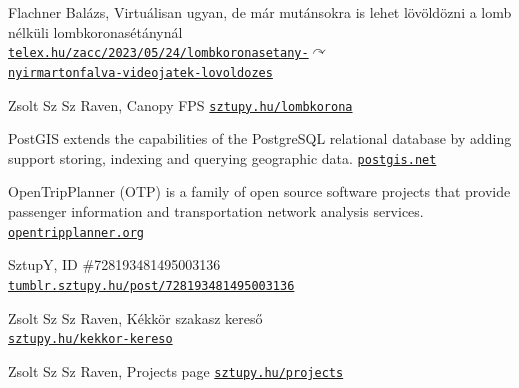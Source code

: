 \documentclass[a5paper,10pt]{article}
\begin{document}
\begin{thebibliography}{99}
 Flachner Balázs, Virtuálisan ugyan, de már mutánsokra is lehet lövöldözni a lomb nélküli lombkoronasétánynál\\
\href{https://telex.hu/zacc/2023/05/24/lombkoronasetany-nyirmartonfalva-videojatek-lovoldozes}{\texttt{telex.hu/zacc/2023/05/24/lombkoronasetany-}$\curvearrowright$\\\texttt{nyirmartonfalva-videojatek-lovoldozes}}

 Zsolt Sz Sz Raven, Canopy FPS \href{https://sztupy.hu/lombkorona/}{\texttt{sztupy.hu/lombkorona}}

 PostGIS extends the capabilities of the PostgreSQL relational database by adding support storing, indexing and querying geographic data.
\href{https://postgis.net/}{\texttt{postgis.net}}

 OpenTripPlanner (OTP) is a family of open source software projects that provide passenger information and transportation network analysis services. \\
\href{https://opentripplanner.org/}{\texttt{opentripplanner.org}}

 SztupY, ID \#728193481495003136 \\
\href{https://tumblr.sztupy.hu/post/728193481495003136}{\texttt{tumblr.sztupy.hu/post/728193481495003136}}

 Zsolt Sz Sz Raven, Kékkör szakasz kereső \\
\href{https://sztupy.hu/kekkor-kereso/}{\texttt{sztupy.hu/kekkor-kereso}}

 Zsolt Sz Sz Raven, Projects page \href{https://sztupy.hu/projects/}{\texttt{sztupy.hu/projects}}

\end{thebibliography}
\end{document}
